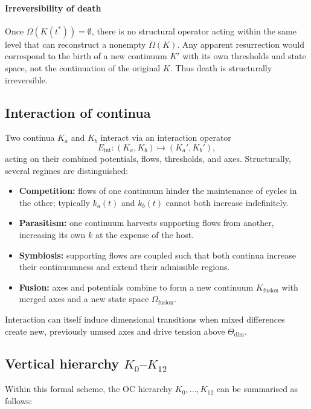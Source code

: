 \paragraph{Irreversibility of death}
Once \(\Omega(K(t^\ast)) = \emptyset\), there is no structural operator acting within the same level that can reconstruct a nonempty \(\Omega(K)\).
Any apparent resurrection would correspond to the birth of a new continuum \(K'\) with its own thresholds and state space, not the continuation of the original \(K\).
Thus death is structurally irreversible.

\subsection{Interaction of continua}

Two continua \(K_a\) and \(K_b\) interact via an interaction operator
\[
    E_{\mathrm{int}} : (K_a,K_b) \mapsto (K_a',K_b'),
\]
acting on their combined potentials, flows, thresholds, and axes.
Structurally, several regimes are distinguished:

\begin{itemize}
    \item \textbf{Competition:} flows of one continuum hinder the maintenance of cycles in the other; typically \(k_a(t)\) and \(k_b(t)\) cannot both increase indefinitely.
    \item \textbf{Parasitism:} one continuum harvests supporting flows from another, increasing its own \(k\) at the expense of the host.
    \item \textbf{Symbiosis:} supporting flows are coupled such that both continua increase their continuumness and extend their admissible regions.
    \item \textbf{Fusion:} axes and potentials combine to form a new continuum \(K_{\mathrm{fusion}}\) with merged axes and a new state space \(\Omega_{\mathrm{fusion}}\).
\end{itemize}

Interaction can itself induce dimensional transitions when mixed differences
create new, previously unused axes and drive tension above
\(\Theta_{\mathrm{dim}}\).

\subsection{Vertical hierarchy \texorpdfstring{$K_0$–$K_{12}$}{K0--K12}}

Within this formal scheme, the OC hierarchy \(K_0,\dots,K_{12}\) can be summarised as follows:

